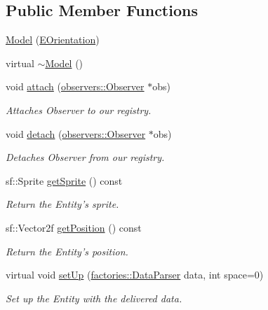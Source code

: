\subsection*{\-Public \-Member \-Functions}
\begin{DoxyCompactItemize}
\item 
\hyperlink{classmodels_1_1Model_abd9a509f4b8e0bd6970407dfac1e2303}{\-Model} (\hyperlink{namespacemodels_adec64ede5178a8b8fed882b3790d423d}{\-E\-Orientation})
\item 
virtual \hyperlink{classmodels_1_1Model_acda18e43859c8c9e0fd657d65e56ee21}{$\sim$\-Model} ()
\item 
void \hyperlink{classmodels_1_1Model_abd9e5c714ab6f70da2fa644bd79bd58a}{attach} (\hyperlink{classobservers_1_1Observer}{observers\-::\-Observer} $\ast$obs)
\begin{DoxyCompactList}\small\item\em \-Attaches \-Observer to our registry. \end{DoxyCompactList}\item 
void \hyperlink{classmodels_1_1Model_a56d90a5a413af33dcfda9f26e7f364c3}{detach} (\hyperlink{classobservers_1_1Observer}{observers\-::\-Observer} $\ast$obs)
\begin{DoxyCompactList}\small\item\em \-Detaches \-Observer from our registry. \end{DoxyCompactList}\item 
sf\-::\-Sprite \hyperlink{classmodels_1_1Model_ac64cdcca9d1eb00ab0efcf8ebfec9306}{get\-Sprite} () const 
\begin{DoxyCompactList}\small\item\em \-Return the \-Entity's sprite. \end{DoxyCompactList}\item 
sf\-::\-Vector2f \hyperlink{classmodels_1_1Model_a5cd9d2b543625d5f73ecaf0f8b52c29d}{get\-Position} () const 
\begin{DoxyCompactList}\small\item\em \-Return the \-Entity's position. \end{DoxyCompactList}\item 
virtual void \hyperlink{classmodels_1_1Model_a84e7f88ec595f610cca3a5d977c7900f}{set\-Up} (\hyperlink{classfactories_1_1DataParser}{factories\-::\-Data\-Parser} data, int space=0)
\begin{DoxyCompactList}\small\item\em \-Set up the \-Entity with the delivered data. \end{DoxyCompactList}\item 

\end{DoxyCompactItemize}

